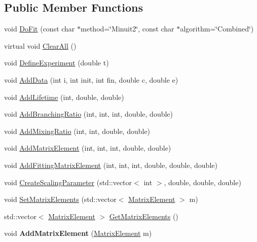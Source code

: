 \subsection*{Public Member Functions}
\begin{DoxyCompactItemize}
\item 
void \hyperlink{classCoulExFitter_a08b4d7487381e52c0da70ab809e70fd4}{Do\-Fit} (const char $\ast$method=\char`\"{}Minuit2\char`\"{}, const char $\ast$algorithm=\char`\"{}Combined\char`\"{})
\item 
virtual void \hyperlink{classCoulExFitter_a3dc34ce26c8906acefada4da62ebe27f}{Clear\-All} ()
\item 
void \hyperlink{classCoulExFitter_adf6c8ef07257352eee65ad39eb900eb1}{Define\-Experiment} (double t)
\item 
void \hyperlink{classCoulExFitter_a81f503e2d4de8f39ad33b98327e5b8ab}{Add\-Data} (int i, int init, int fin, double c, double e)
\item 
void \hyperlink{classCoulExFitter_a5e2fa54175664c1ff80ec1562d7deb9d}{Add\-Lifetime} (int, double, double)
\item 
void \hyperlink{classCoulExFitter_a483e51a7fd5262d65b94f3d0e9d9a2b1}{Add\-Branching\-Ratio} (int, int, int, double, double)
\item 
void \hyperlink{classCoulExFitter_a6359add575cbb5eaa3f1f0a04a108643}{Add\-Mixing\-Ratio} (int, int, double, double)
\item 
void \hyperlink{classCoulExFitter_ae2580c027c32cdd4eb5d4e6283b8bca1}{Add\-Matrix\-Element} (int, int, int, double, double)
\item 
void \hyperlink{classCoulExFitter_a8d2a0995d0d2239629e23810362177b8}{Add\-Fitting\-Matrix\-Element} (int, int, int, double, double, double)
\item 
void \hyperlink{classCoulExFitter_a5241e2d16d908fc409a2bd078846fa5e}{Create\-Scaling\-Parameter} (std\-::vector$<$ int $>$, double, double, double)
\item 
void \hyperlink{classCoulExFitter_a3ed4407b3cbd821bafc4aabc13dfd44a}{Set\-Matrix\-Elements} (std\-::vector$<$ \hyperlink{classMatrixElement}{Matrix\-Element} $>$ m)
\item 
std\-::vector$<$ \hyperlink{classMatrixElement}{Matrix\-Element} $>$ \hyperlink{classCoulExFitter_ae866bffb9fe2ef25c03e79cedd1357a8}{Get\-Matrix\-Elements} ()
\item 
\hypertarget{classCoulExFitter_a655f0e51447913ee942522c8ddf0a1c2}{void {\bfseries Add\-Matrix\-Element} (\hyperlink{classMatrixElement}{Matrix\-Element} m)}\label{classCoulExFitter_a655f0e51447913ee942522c8ddf0a1c2}


\end{DoxyCompactItemize}
